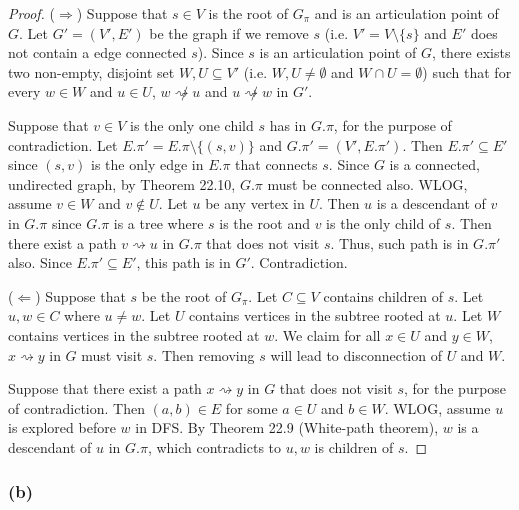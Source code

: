 \begin{proof}
    ($\Longrightarrow$)
    Suppose that $s \in V$ is the root of $G_\pi$ 
    and is an articulation point of $G$.
    Let $G' = (V',E')$ be the graph if we remove $s$
    (i.e. $V' = V \setminus \{ s \}$ 
    and $E'$ does not contain a edge connected $s$).
    Since $s$ is an articulation point of $G$,
    there exists two non-empty, disjoint set $W, U \subseteq V'$
    (i.e. $W, U \neq \emptyset$ and $W \cap U = \emptyset$)
    such that for every $w \in W$ and $u \in U$,
    $w \not\rightsquigarrow u$ and $u \not\rightsquigarrow w$
    in $G'$.

    Suppose that $v \in V$ is the only one child $s$ has in $G.\pi$,
    for the purpose of contradiction.
    Let $E.\pi' = E.\pi \setminus \{ (s,v) \}$
    and $G.\pi' = (V',E.\pi')$.
    Then $E.\pi' \subseteq E'$
    since $(s,v)$ is the only edge in $E.\pi$ that connects $s$.
    Since $G$ is a connected, undirected graph,
    by Theorem 22.10,
    $G.\pi$ must be connected also.
    WLOG, assume $v \in W$ and $v \notin U$.
    Let $u$ be any vertex in $U$.
    Then $u$ is a descendant of $v$ in $G.\pi$
    since $G.\pi$ is a tree 
    where $s$ is the root and $v$ is the only child of $s$.
    Then there exist a path $v \rightsquigarrow u$ in $G.\pi$
    that does not visit $s$.
    Thus, such path is in $G.\pi'$ also.
    Since $E.\pi' \subseteq E'$,
    this path is in $G'$.
    Contradiction.

    ($\Longleftarrow$)
    Suppose that $s$ be the root of $G_\pi$.
    Let $C \subseteq V$ contains children of $s$.
    Let $u,w \in C$ where $u \neq w$.
    Let $U$ contains vertices in the subtree rooted at $u$.
    Let $W$ contains vertices in the subtree rooted at $w$.
    We claim for all $x \in U$ and $y \in W$,
    $x \rightsquigarrow y$ in $G$ must visit $s$.
    Then removing $s$ will lead to disconnection of $U$ and $W$.

    Suppose that there exist a path $x \rightsquigarrow y$ in $G$
    that does not visit $s$, for the purpose of contradiction.
    Then $(a,b) \in E$ for some $a \in U$ and $b \in W$.
    WLOG, assume $u$ is explored before $w$ in DFS.
    By Theorem 22.9 (White-path theorem),
    $w$ is a descendant of $u$ in $G.\pi$,
    which contradicts to $u,w$ is children of $s$.
\end{proof}

\subsubsection*{(b)}

